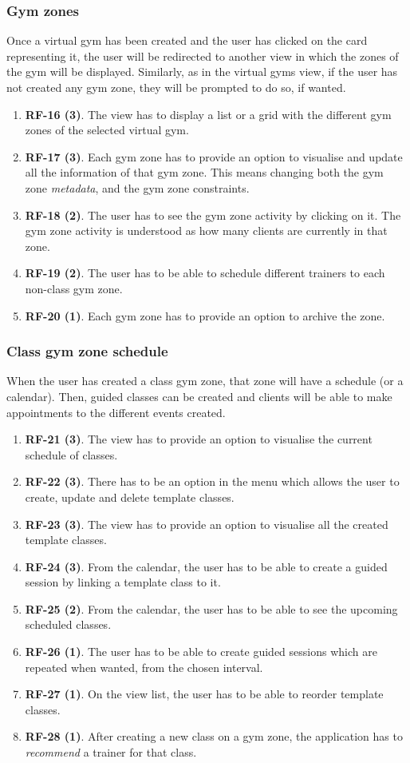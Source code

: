 \documentclass[a4paper, 12pt, oneside]{book}
\begin{document}
\subsubsection{Gym zones}
Once a virtual gym has been created and the user has clicked on the card representing it, the user will be redirected to another view in which the zones of the gym will be displayed. Similarly, as in the virtual gyms view, if the user has not created any gym zone, they will be prompted to do so, if wanted.
\begin{enumerate}[label = -]
	\item \textbf{RF-16 (3)}. The view has to display a list or a grid with the different gym zones of the selected virtual gym.
	\item \textbf{RF-17 (3)}. Each gym zone has to provide an option to visualise and update all the information of that gym zone. This means changing both the gym zone \emph{metadata}, and the gym zone constraints.
	\item \textbf{RF-18 (2)}. The user has to see the gym zone activity by clicking on it. The gym zone activity is understood as how many clients are currently in that zone.
	\item \textbf{RF-19 (2)}. The user has to be able to schedule different trainers to each non-class gym zone.
	\item \textbf{RF-20 (1)}. Each gym zone has to provide an option to archive the zone.
\end{enumerate}
\subsubsection{Class gym zone schedule}
When the user has created a class gym zone, that zone will have a schedule (or a calendar). Then, guided classes can be created and clients will be able to make appointments to the different events created.
\begin{enumerate}[label = -]
	\item \textbf{RF-21 (3)}. The view has to provide an option to visualise the current schedule of classes.
	\item \textbf{RF-22 (3)}. There has to be an option in the menu which allows the user to create, update and delete template classes.
	\item \textbf{RF-23 (3)}. The view has to provide an option to visualise all the created template classes.
	\item \textbf{RF-24 (3)}. From the calendar, the user has to be able to create a guided session by linking a template class to it.
	\item \textbf{RF-25 (2)}. From the calendar, the user has to be able to see the upcoming scheduled classes.
	\item \textbf{RF-26 (1)}. The user has to be able to create guided sessions which are repeated when wanted, from the chosen interval.
	\item \textbf{RF-27 (1)}. On the view list, the user has to be able to reorder template classes.
	\item \textbf{RF-28 (1)}. After creating a new class on a gym zone, the application has to \emph{recommend} a trainer for that class.
\end{enumerate}
\end{document}
